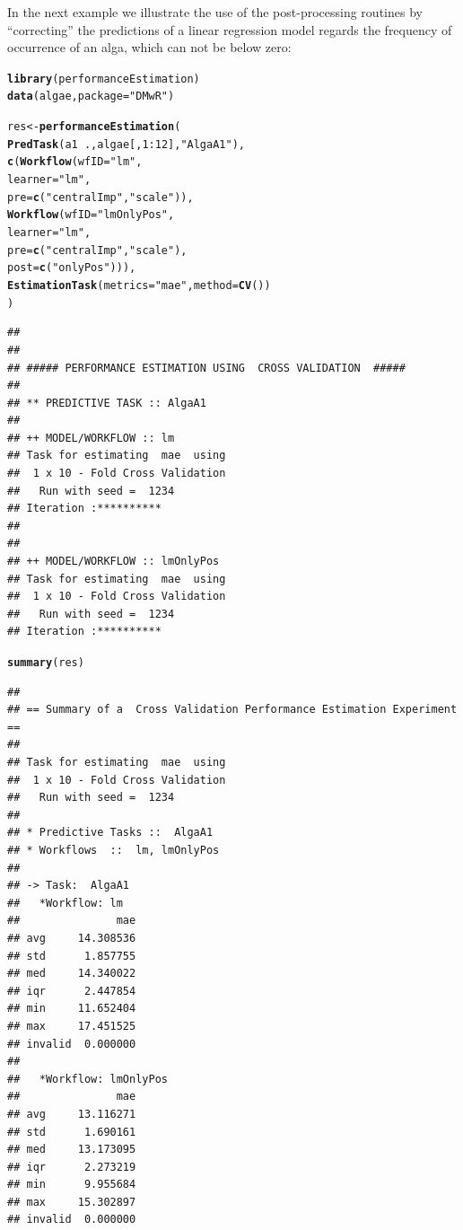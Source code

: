\documentclass[10pt,a4paper]{article}\usepackage[]{graphicx}\usepackage[]{color}
\makeatletter
\newcommand{\hlnum}[1]{\textcolor[rgb]{0.686,0.059,0.569}{#1}}%
\newcommand{\hlstr}[1]{\textcolor[rgb]{0.192,0.494,0.8}{#1}}%
\newcommand{\hlopt}[1]{\textcolor[rgb]{0,0,0}{#1}}%
\newcommand{\hlstd}[1]{\textcolor[rgb]{0.345,0.345,0.345}{#1}}%
\newcommand{\hlkwb}[1]{\textcolor[rgb]{0.69,0.353,0.396}{#1}}%
\newcommand{\hlkwc}[1]{\textcolor[rgb]{0.333,0.667,0.333}{#1}}%
\newcommand{\hlkwd}[1]{\textcolor[rgb]{0.737,0.353,0.396}{\textbf{#1}}}%
\newenvironment{kframe}{%
 \def\at@end@of@kframe{}%
 \ifinner\ifhmode%
  \def\at@end@of@kframe{\end{minipage}}%
  \begin{minipage}{\columnwidth}%
 \fi\fi%
 \def\FrameCommand##1{\hskip\@totalleftmargin \hskip-\fboxsep
 \colorbox{shadecolor}{##1}\hskip-\fboxsep
     \hskip-\linewidth \hskip-\@totalleftmargin \hskip\columnwidth}%
 \MakeFramed {\advance\hsize-\width
   \@totalleftmargin\z@ \linewidth\hsize
   \@setminipage}}%
 {\par\unskip\endMakeFramed%
 \at@end@of@kframe}
\newenvironment{knitrout}{}{} %
\makeatother
\begin{document}
In the next example we illustrate the use of the post-processing routines by ``correcting'' the predictions of a linear regression model regards the frequency of occurrence of an alga, which can not be below zero:

\begin{knitrout}\footnotesize
{}\color{fgcolor}\begin{kframe}
\begin{alltt}
\hlkwd{library}\hlstd{(performanceEstimation)}
\hlkwd{data}\hlstd{(algae,}\hlkwc{package}\hlstd{=}\hlstr{"DMwR"}\hlstd{)}

\hlstd{res} \hlkwb{<-} \hlkwd{performanceEstimation}\hlstd{(}
         \hlkwd{PredTask}\hlstd{(a1} \hlopt{~} \hlstd{.,algae[,}\hlnum{1}\hlopt{:}\hlnum{12}\hlstd{],}\hlstr{"AlgaA1"}\hlstd{),}
         \hlkwd{c}\hlstd{(}\hlkwd{Workflow}\hlstd{(}\hlkwc{wfID}\hlstd{=}\hlstr{"lm"}\hlstd{,}
                    \hlkwc{learner}\hlstd{=}\hlstr{"lm"}\hlstd{,}
                    \hlkwc{pre}\hlstd{=}\hlkwd{c}\hlstd{(}\hlstr{"centralImp"}\hlstd{,}\hlstr{"scale"}\hlstd{)),}
           \hlkwd{Workflow}\hlstd{(}\hlkwc{wfID}\hlstd{=}\hlstr{"lmOnlyPos"}\hlstd{,}
                    \hlkwc{learner}\hlstd{=}\hlstr{"lm"}\hlstd{,}
                    \hlkwc{pre}\hlstd{=}\hlkwd{c}\hlstd{(}\hlstr{"centralImp"}\hlstd{,}\hlstr{"scale"}\hlstd{),}
                    \hlkwc{post}\hlstd{=}\hlkwd{c}\hlstd{(}\hlstr{"onlyPos"}\hlstd{))),}
         \hlkwd{EstimationTask}\hlstd{(}\hlkwc{metrics}\hlstd{=}\hlstr{"mae"}\hlstd{,}\hlkwc{method}\hlstd{=}\hlkwd{CV}\hlstd{())}
         \hlstd{)}
\end{alltt}
\begin{verbatim}
## 
## 
## ##### PERFORMANCE ESTIMATION USING  CROSS VALIDATION  #####
## 
## ** PREDICTIVE TASK :: AlgaA1
## 
## ++ MODEL/WORKFLOW :: lm 
## Task for estimating  mae  using
##  1 x 10 - Fold Cross Validation
## 	 Run with seed =  1234 
## Iteration :**********
## 
## 
## ++ MODEL/WORKFLOW :: lmOnlyPos 
## Task for estimating  mae  using
##  1 x 10 - Fold Cross Validation
## 	 Run with seed =  1234 
## Iteration :**********
\end{verbatim}
\begin{alltt}
\hlkwd{summary}\hlstd{(res)}
\end{alltt}
\begin{verbatim}
## 
## == Summary of a  Cross Validation Performance Estimation Experiment ==
## 
## Task for estimating  mae  using
##  1 x 10 - Fold Cross Validation
## 	 Run with seed =  1234 
## 
## * Predictive Tasks ::  AlgaA1
## * Workflows  ::  lm, lmOnlyPos 
## 
## -> Task:  AlgaA1
##   *Workflow: lm 
##               mae
## avg     14.308536
## std      1.857755
## med     14.340022
## iqr      2.447854
## min     11.652404
## max     17.451525
## invalid  0.000000
## 
##   *Workflow: lmOnlyPos 
##               mae
## avg     13.116271
## std      1.690161
## med     13.173095
## iqr      2.273219
## min      9.955684
## max     15.302897
## invalid  0.000000
\end{verbatim}
\end{kframe}
\end{knitrout}
\end{document}
